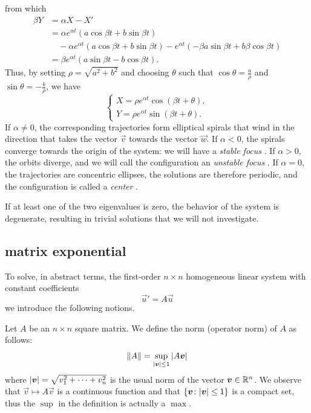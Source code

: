 from which
\begin{align*}
\beta Y
&= \alpha X - X'\\
& = \alpha e^{\alpha t}(a \cos \beta t + b \sin \beta t) \\
&\quad - \alpha e^{\alpha t}(a\cos \beta t + b \sin \beta t)
  - e^{\alpha t}(-\beta a \sin \beta t + b \beta \cos \beta t) \\
 &= \beta e^{\alpha t}(a\sin \beta t - b \cos \beta t).
\end{align*}
Thus, by setting $\rho=\sqrt{a^2+b^2}$ and choosing $\theta$ such that $\cos
\theta = \frac a \rho$ and $\sin \theta = - \frac b \rho$, we have
\[
  \begin{cases}
   X = \rho e^{\alpha t} \cos(\beta t + \theta),\\
   Y = \rho e^{\alpha t} \sin(\beta t + \theta).
  \end{cases}
\]
If $\alpha \neq 0$, the corresponding trajectories form elliptical spirals that
wind in the direction that takes the vector $\vec v$ towards the vector $\vec
w$. If $\alpha < 0$, the spirals converge towards the origin of the system: we
will have a \emph{stable focus}%
. If $\alpha >0$, the orbits diverge, and we will call the configuration an \emph{unstable focus}%
. If $\alpha = 0$, the trajectories are concentric ellipses, the solutions are therefore periodic, and the configuration is called a \emph{center}%
.

If at least one of the two eigenvalues is zero, the behavior of the system is
degenerate, resulting in trivial solutions that we will not investigate.

\subsection{matrix exponential}

To solve, in abstract terms, the first-order $n\times n$ homogeneous linear
system with constant coefficients
\[
  \vec u' = A \vec u
\]
we introduce the following notions.

Let $A$ be an $n\times n$ square matrix. We define the norm (operator norm) of
$A$ as follows:
\[
  {\left\Vert  A \right\Vert} = \sup_{{\left|\boldsymbol v\right|} \le 1} {\left|A\boldsymbol v\right|}
\]
where ${\left| \boldsymbol v\right|} = \sqrt{v_1^2+ \dots + v_n^2}$ is the usual norm of the
vector $\boldsymbol v\in {\mathbb R}^n$. We observe that $\vec v\mapsto A\vec v$ is a
continuous function and that ${\left\{ \boldsymbol v\colon {\left| \boldsymbol v\right|} \le 1 \right\}}$ is a
compact set, thus the $\sup$ in the definition is actually a $\max$.

